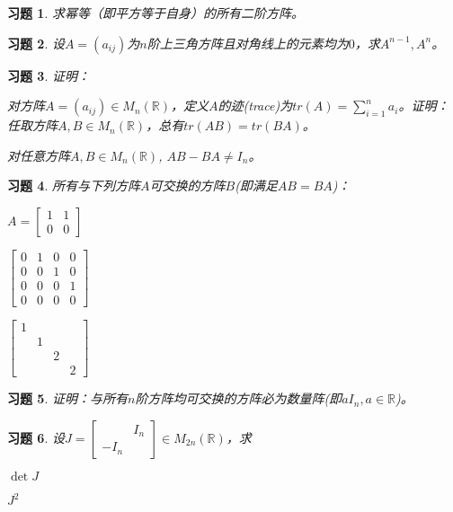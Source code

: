 \documentclass[a4paper]{book}
\newtheorem{ex}{习题}[chapter]
\newcommand{\enum}{\begin{list}{}{\setlength{\leftmargin}{0pt} \setlength{\itemindent}{2.5em} \setlength{\listparindent}{2em}}}
\begin{document}
\begin{ex} \label{ex:3.17}
求幂等（即平方等于自身）的所有二阶方阵。
\end{ex}

\begin{ex} \label{ex:3.18}
设$A = (a_{ij})$为$n$阶上三角方阵且对角线上的元素均为$0$，求$A^{n-1}, A^n$。
\end{ex}

\begin{ex} \label{ex:3.19}
证明：

\enum
\item[(1)] 对方阵$A = (a_{ij}) \in M_n(\mathbb{R})$，定义$A$的迹(trace)为$tr(A) = \sum\limits_{i=1}^n a_i$。证明：任取方阵$A, B\in M_n(\mathbb{R})$，总有$tr(AB) = tr(BA)$。

\item[(2)] 对任意方阵$A, B\in M_n(\mathbb{R})$, $AB - BA \neq I_n$。
\end{list}
\end{ex}

\begin{ex} \label{ex:3.20}
所有与下列方阵$A$可交换的方阵$B$(即满足$AB = BA$)：

\enum
\item[(1)] $A = \begin{bmatrix} 1 & 1 \\ 0 & 0 \end{bmatrix}$ \item[(2)] $\begin{bmatrix} 0 & 1 & 0 & 0 \\ 0 & 0 & 1 & 0 \\ 0 & 0 & 0 & 1 \\ 0 & 0 & 0 & 0 \end{bmatrix}$
\item[(3)] $\begin{bmatrix} 1 & & & \\ & 1 & & \\ & & 2 & \\ & & & 2 \end{bmatrix}$
\end{list}
\end{ex}

\begin{ex} \label{ex:3.21}
证明：与所有$n$阶方阵均可交换的方阵必为数量阵(即$aI_n, a\in\mathbb{R}$)。
\end{ex}

\begin{ex} \label{ex:3.22}
设$J = \begin{bmatrix} & I_n \\ -I_n & \end{bmatrix} \in M_{2n}(\mathbb{R})$，求

\enum
\item[(1)] $\det J$
\item[(2)] $J^2$
\end{list}
\end{ex}
\end{document}

